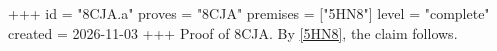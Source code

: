 +++
id = "8CJA.a"
proves = "8CJA"
premises = ["5HN8"]
level = "complete"
created = 2026-11-03
+++
Proof of 8CJA. By \ref{5HN8}, the claim follows.
